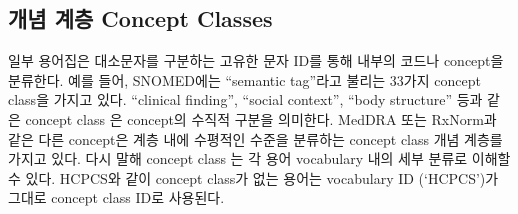 \documentclass[10.5pt]{book}
\theoremstyle{definition}
\theoremstyle{definition}
\theoremstyle{definition}
\theoremstyle{remark}
\begin{document}
\subsection{개념 계층 Concept Classes}\label{--concept-classes}

일부 용어집은 대소문자를 구분하는 고유한 문자 ID를 통해 내부의 코드나
concept을 분류한다. 예를 들어, SNOMED에는 ``semantic tag''라고 불리는
33가지 concept class을 가지고 있다. ``clinical finding'', ``social
context'', ``body structure'' 등과 같은 concept class 은 concept의
수직적 구분을 의미한다. MedDRA 또는 RxNorm과 같은 다른 concept은 계층
내에 수평적인 수준을 분류하는 concept class 개념 계층를 가지고 있다.
다시 말해 concept class 는 각 용어 vocabulary 내의 세부 분류로 이해할 수
있다. HCPCS와 같이 concept class가 없는 용어는 vocabulary ID (`HCPCS')가
그대로 concept class ID로 사용된다. 
\end{document}
